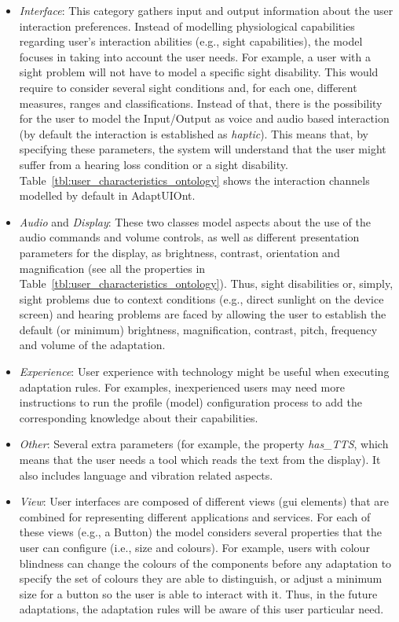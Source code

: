 \begin{itemize}
  \item \textit{Interface}: This category gathers input and output information
  about the user interaction preferences. Instead of modelling physiological
  capabilities regarding user's interaction abilities (e.g., sight capabilities),
  the model focuses in taking into account the user needs. For example, a user
  with a sight problem will not have to model a specific sight disability. This
  would require to consider several sight conditions and, for each one, different
  measures, ranges and classifications. Instead of that, there is the possibility
  for the user to model the Input/Output as voice and audio based interaction
  (by default the interaction is established as \textit{haptic}). This means that,
  by specifying these parameters, the system will understand that the user might
  suffer from a hearing loss condition or a sight disability.
  Table~\ref{tbl:user_characteristics_ontology} shows the interaction channels
  modelled by default in AdaptUIOnt.

  \item \textit{Audio} and \textit{Display}: These two classes model aspects
  about the use of the audio commands and volume controls, as well as different
  presentation parameters for the display, as brightness, contrast, orientation
  and magnification (see all the properties in Table~\ref{tbl:user_characteristics_ontology}).
  Thus, sight disabilities or, simply, sight problems due to context conditions
  (e.g., direct sunlight on the device screen) and hearing problems are faced by
  allowing the user to establish the default (or minimum) brightness, magnification,
  contrast, pitch, frequency and volume of the adaptation.
    
  \item \textit{Experience}: User experience with technology might be useful when
  executing adaptation rules. For examples, inexperienced users may need more
  instructions to run the profile (model) configuration process to add the
  corresponding knowledge about their capabilities.
  
  \item \textit{Other}: Several extra parameters (for example, the property
  \textit{has\_TTS}, which means that the user needs a tool which reads the text from
  the display). It also includes language and vibration related aspects.
  
  \item \textit{View}: User interfaces are composed of different views (\acs{gui} 
  elements) that are combined for representing different applications and services. 
  For each of these views (e.g., a Button) the model considers several properties 
  that the user can configure (i.e., size and colours). For example, users with 
  colour blindness can change the colours of the components before any adaptation 
  to specify the set of colours they are able to distinguish, or adjust a 
  minimum size for a button so the user is able to interact with it. Thus, in 
  the future adaptations, the adaptation rules will be aware of this user 
  particular need.
  

\end{itemize}
